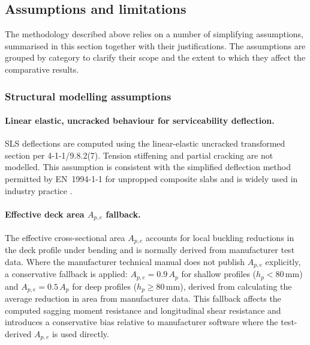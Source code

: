 \subsection{Assumptions and limitations}
\label{sec:assumptions}
The methodology described above relies on a number of simplifying assumptions, summarised in this section together with their justifications. The assumptions are grouped by category to clarify their scope and the extent to which they affect the comparative results.

\subsubsection*{Structural modelling assumptions}

\paragraph{Linear elastic, uncracked behaviour for serviceability deflection.}
SLS deflections are computed using the linear-elastic uncracked transformed section per 4-1-1/9.8.2(7). Tension stiffening and partial cracking are not modelled. This assumption is consistent with the simplified deflection method permitted by EN~1994-1-1 for unpropped composite slabs and is widely used in industry practice \citep{RefWorks:scip359}.

\paragraph{Effective deck area $A_{p,e}$ fallback.}
The effective cross-sectional area $A_{p,e}$ accounts for local buckling reductions in the deck profile under bending and is normally derived from manufacturer test data. Where the manufacturer technical manual does not publish $A_{p,e}$ explicitly, a conservative fallback is applied: $A_{p,e} = 0.9\,A_p$ for shallow profiles ($h_p < 80$\,mm) and $A_{p,e} = 0.5\,A_p$ for deep profiles ($h_p \ge 80$\,mm), derived from calculating the average reduction in area from manufacturer data. This fallback affects the computed sagging moment resistance and longitudinal shear resistance and introduces a conservative bias relative to manufacturer software where the test-derived $A_{p,e}$ is used directly.

